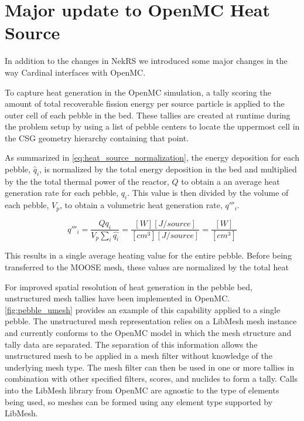 \section{Major update to OpenMC Heat Source} \label{sec:openmc_tallies}

In addition to the changes in NekRS we introduced some major changes in the way Cardinal interfaces with OpenMC.

To capture heat generation in the OpenMC simulation, a tally scoring the amount of total recoverable fission energy per source particle is applied to the outer cell of each pebble in the bed. These tallies are created at runtime during the problem setup by using a list of pebble centers to locate the uppermost cell in the CSG geometry hierarchy containing that point.

As summarized in \autoref{eq:heat_source_normalization}, the energy deposition for each pebble, $\hat{q}_{i}$, is normalized by the total energy deposition in the bed and multiplied by the the total thermal power of the reactor, $Q$ to obtain a an average heat generation rate for each pebble, $q_i$. This value is then divided by the volume of each pebble, $V_p$, to obtain a volumetric heat generation rate, $q'''_i$.

\begin{equation}
    \label{eq:heat_source_normalization}
    q'''_i = \frac{Q q_i}{V_{p}\sum_{i}{\hat{q_i}}} = \frac{[W][J/source]}{[cm^{3}] [J/source]} = \frac{[W]}{[cm^{3}]}
\end{equation}

This results in a single average heating value for the entire pebble. Before being transferred to the MOOSE mesh, these values are normalized by the total heat

For improved spatial resolution of heat generation in the pebble bed, unstructured mesh tallies have been implemented in OpenMC. \autoref{fig:pebble_umesh} provides an example of this capability applied to a single pebble. The unstructured mesh representation relies on a LibMesh mesh instance and currently conforms to the OpenMC model in which the mesh structure and tally data are separated. The separation of this information allows the unstructured mesh to be applied in a mesh filter without knowledge of the underlying mesh type. The mesh filter can then be used in one or more tallies in combination with other specified filters, scores, and nuclides to form a tally. Calls into the LibMesh library from OpenMC are agnostic to the type of elements being used, so meshes can be formed using any element type supported by LibMesh.


